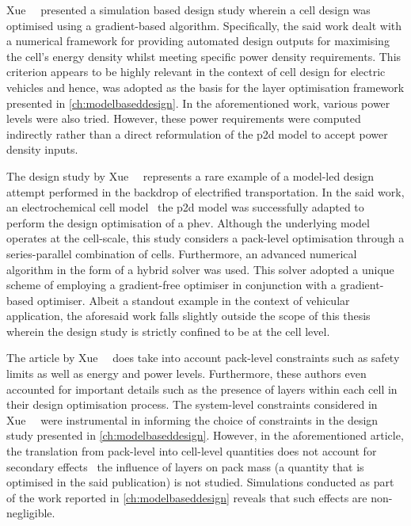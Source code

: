 Xue~\etal~\cite{Xue2013}  presented a  simulation based  design study  wherein a
cell design  was optimised using  a gradient-based algorithm.  Specifically, the
said  work dealt  with  a  numerical framework  for  providing automated  design
outputs for maximising  the cell's energy density whilst  meeting specific power
density  requirements. This  criterion  appears  to be  highly  relevant in  the
context of cell design for electric vehicles and hence, was adopted as the basis
for the layer optimisation framework presented in \cref{ch:modelbaseddesign}. In
the aforementioned  work, various power  levels were also tried.  However, these
power requirements were  computed indirectly rather than  a direct reformulation
of the \gls{p2d} model to accept power density inputs.

The  design   study  by  Xue~\etal~\cite{Xue2014}  represents   a  rare  example
of  a  model-led  design  attempt  performed  in  the  backdrop  of  electrified
transportation.  In  the  said  work, an  electrochemical  cell  model  \viz~the
\gls{p2d} model was successfully adapted to perform the design optimisation of a
\gls{phev}. Although the underlying model operates at the cell-scale, this study
considers  a  pack-level  optimisation  through  a  series-parallel  combination
of  cells.  Furthermore, an  advanced  numerical  algorithm  in  the form  of  a
hybrid  solver was  used. This  solver adopted  a unique  scheme of  employing a
gradient-free optimiser in conjunction with a gradient-based optimiser. Albeit a
standout example  in the  context of vehicular  application, the  aforesaid work
falls slightly  outside the  scope of  this thesis wherein  the design  study is
strictly confined  to be at  the cell level.


The  article  by  Xue~\etal~\cite{Xue2014}  does take  into  account  pack-level
constraints  such  as  safety  limits  as  well  as  energy  and  power  levels.
Furthermore,  these authors  even accounted  for important  details such  as the
presence  of layers  within  each  cell in  their  design optimisation  process.
The  system-level   constraints  considered  in   Xue~\etal~\cite{Xue2014}  were
instrumental  in  informing  the  choice  of constraints  in  the  design  study
presented in \cref{ch:modelbaseddesign}. However, in the aforementioned article,
the translation from pack-level into  cell-level quantities does not account for
secondary effects \ie~the  influence of layers on pack mass  (a quantity that is
optimised in the said publication) is not studied. Simulations conducted as part
of the work reported in \cref{ch:modelbaseddesign} reveals that such effects are
non-negligible.

